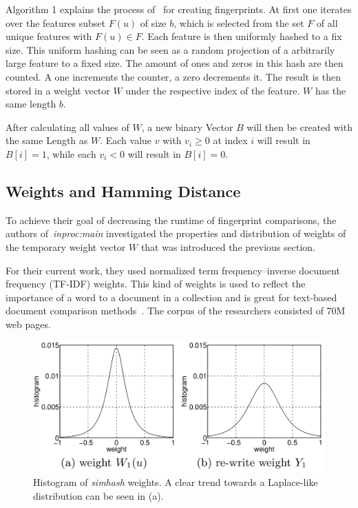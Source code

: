 \documentclass[12pt,a4paper,DIV=calc]{scrartcl}
\begin{document}
Algorithm 1 explains the process of~\cite{inproc:evaluation} for creating fingerprints.
At first one iterates over the features subset $F(u)$ of size $b$, which is selected from the set $F$ of all unique features with $F(u) \in F$.
Each feature is then uniformly hashed to a fix size.
This uniform hashing can be seen as a random projection of a arbitrarily large feature to a fixed size.
The amount of ones and zeros in this hash are then counted.
A one increments the counter, a zero decrements it.
The result is then stored in a weight vector $W$ under the respective index of the feature. $W$ has the same length $b$.

After calculating all values of $W$, a new binary Vector $B$ will then be created with the same Length as $W$.
Each value $v$ with $v_i \geq 0$ at index $i$ will result in $B[i] = 1$, while each $v_i < 0$ will result in $B[i] = 0$.

\subsection{Weights and Hamming Distance}

To achieve their goal of decreasing the runtime of fingerprint comparisons, the authors of~\emph{inproc:main} investigated the properties and distribution of weights of the temporary weight vector $W$ that was introduced the previous section.

For their current work, they used normalized term frequency–inverse document frequency (TF-IDF) weights.
This kind of weights is used to reflect the importance of a word to a document in a collection and is great for text-based document comparison methods~\cite{Salton:1986:IMI:576628}.
The corpus of the researchers consisted of 70M web pages.

\begin{figure}[H]
    \includegraphics[scale=0.4]{./gfx/distribution.png}
    \centering
    \caption{Histogram of \emph{simhash} weights. A clear trend towards a Laplace-like distribution can be seen in (a).}\label{fig:weight-distribution}
\end{figure}
\end{document}
